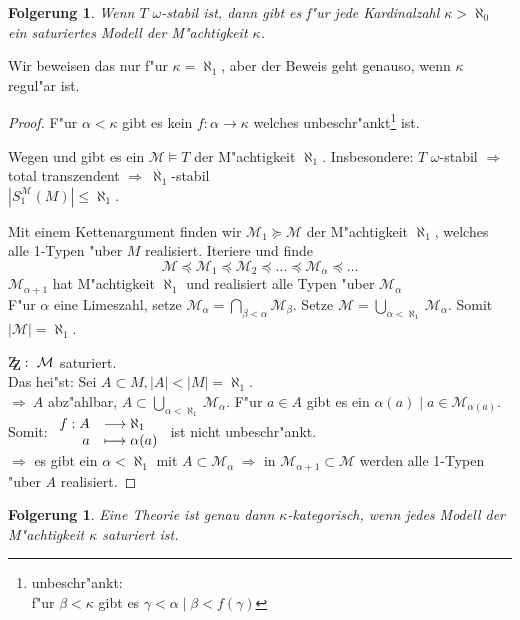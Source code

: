 \documentclass[a4paper,12pt,numbers=noenddot,parskip=full]{scrartcl}
\newcommand{\scrM}{\mathcal{M}}
\newcommand{\zz}{\mathrm{Z\kern-.3em\raise-0.5ex\hbox{Z}}:~}
\theoremstyle{dotless}
\newtheorem{corollary}[theorem]{Folgerung}
\begin{document}
\begin{corollary}
	Wenn $T$ $\omega$-stabil ist, dann gibt es f"ur jede Kardinalzahl $\kappa> \aleph_0$ ein saturiertes Modell der M"achtigkeit $\kappa$.
\end{corollary}
Wir beweisen das nur f"ur $\kappa = \aleph_1$, aber der Beweis geht genauso, wenn $\kappa$ regul"ar ist.
\begin{proof}
	F"ur $\alpha < \kappa$ gibt es kein $f: \alpha \longrightarrow \kappa$ welches unbeschr"ankt\footnote{unbeschr"ankt:\\f"ur $\beta<\kappa$ gibt es $\gamma < \alpha \mid \beta < f(\gamma)$} ist.
	
	Wegen  und  gibt es ein $\scrM \models T$ der M"achtigkeit $\aleph_1$. Insbesondere: $T$ $\omega$-stabil $\Rightarrow$ total transzendent $\Rightarrow~ \aleph_1$-stabil\\
	$|S_1^\scrM(M)| \leq \aleph_1$.
	
	Mit einem Kettenargument finden wir $\scrM_1 \succeq \scrM$ der M"achtigkeit $\aleph_1$, welches alle 1-Typen "uber $M$ realisiert. Iteriere und finde
	\begin{equation*}
		\scrM \preceq \scrM_1 \preceq \scrM_2\preceq \dots \preceq \scrM_\alpha \preceq \dots
	\end{equation*}
	$\scrM_{\alpha +1}$ hat M"achtigkeit $\aleph_1$ und realisiert alle Typen "uber $\scrM_\alpha$\\
	F"ur $\alpha$ eine Limeszahl, setze $\scrM_\alpha = \bigcap\limits_{\beta < \alpha} \scrM_\beta$. Setze $\scrM = \bigcup\limits_{\alpha < \aleph_1} \scrM_\alpha$. Somit $|\scrM| = \aleph_1$.
	
	$\zz \scrM$ saturiert.\\
	Das hei"st: Sei $A \subset M, |A|<|M|=\aleph_1$.\\
	$\Rightarrow~ A$ abz"ahlbar, $A \subset \bigcup\limits_{\alpha< \aleph_1} \scrM_\alpha$. F"ur $a \in A$ gibt es ein $\alpha(a) \mid a \in \scrM_{\alpha(a)}$. Somit: $\begin{array}{r l}
		f: A &\longrightarrow \aleph_1\\
		\phantom{f:} a &\longmapsto \alpha(a)
	\end{array}$ ist nicht unbeschr"ankt.\\
	$\Rightarrow$ es gibt ein $\alpha < \aleph_1$ mit $A \subset \scrM_\alpha~ \Rightarrow$ in $\scrM_{\alpha +1} \subset \scrM$ werden alle 1-Typen "uber $A$ realisiert.
\end{proof}
\begin{corollary}
	Eine Theorie ist genau dann $\kappa$-kategorisch, wenn jedes Modell der M"achtigkeit $\kappa$ saturiert ist.
\end{corollary}
\end{document}

